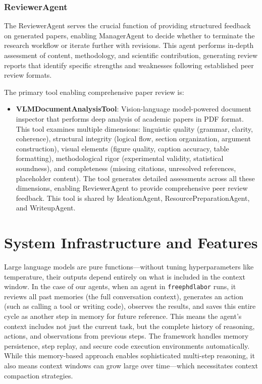 \documentclass{article}
\begin{document}
\subsubsection*{ReviewerAgent}
The ReviewerAgent serves the crucial function of providing structured feedback on generated papers, enabling ManagerAgent to decide whether to terminate the research workflow or iterate further with revisions. This agent performs in-depth assessment of content, methodology, and scientific contribution, generating review reports that identify specific strengths and weaknesses following established peer review formats.

The primary tool enabling comprehensive paper review is:
\begin{itemize}
\item \textbf{VLMDocumentAnalysisTool}: Vision-language model-powered document inspector that performs deep analysis of academic papers in PDF format. This tool examines multiple dimensions: linguistic quality (grammar, clarity, coherence), structural integrity (logical flow, section organization, argument construction), visual elements (figure quality, caption accuracy, table formatting), methodological rigor (experimental validity, statistical soundness), and completeness (missing citations, unresolved references, placeholder content). The tool generates detailed assessments across all these dimensions, enabling ReviewerAgent to provide comprehensive peer review feedback. This tool is shared by IdeationAgent, ResourcePreparationAgent, and WriteupAgent.
\end{itemize}

\section{System Infrastructure and Features}
\label{sec:infrastructure}

Large language models are pure functions---without tuning hyperparameters like temperature, their outputs depend entirely on what is included in the context window. In the case of our agents, when an agent in \texttt{freephdlabor} runs, it reviews all past memories (the full conversation context), generates an action (such as calling a tool or writing code), observes the results, and saves this entire cycle as another step in memory for future reference. This means the agent's context includes not just the current task, but the complete history of reasoning, actions, and observations from previous steps. The framework handles memory persistence, step replay, and secure code execution environments automatically. While this memory-based approach enables sophisticated multi-step reasoning, it also means context windows can grow large over time---which necessitates context compaction strategies.
\end{document}
